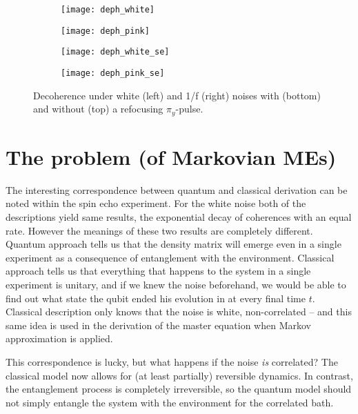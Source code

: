 \documentclass[12pt, twoside]{report}
\numberwithin{equation}{section}
\begin{document}
\begin{figure}
\begingroup
\captionsetup[subfigure]{width=0.9\textwidth}
\centering
\begin{subfigure}[t]{0.45\textwidth}
\centering
\texttt{[image: deph\_white]}
\end{subfigure}
\begin{subfigure}[t]{0.45\textwidth}
\centering
\texttt{[image: deph\_pink]}
\end{subfigure}

\begin{subfigure}[t]{0.45\textwidth}
\centering
\texttt{[image: deph\_white\_se]}
\end{subfigure}
\begin{subfigure}[t]{0.45\textwidth}
\centering
\texttt{[image: deph\_pink\_se]}
\end{subfigure}
\caption{Decoherence under white (left) and 1/f (right) noises with (bottom) and without (top) a refocusing $\pi_y$-pulse.}
\label{fig:cdeph_both}
\endgroup
\end{figure}

\section{The problem (of Markovian MEs)}

The interesting correspondence between quantum and classical derivation can be noted within the spin echo experiment. For the white noise both of the descriptions yield same results, the exponential decay of coherences with an equal rate. However the meanings of these two results are completely different. Quantum approach tells us that the density matrix will emerge even in a single experiment as a consequence of entanglement with the environment. Classical approach tells us that everything that  happens to the system in a single experiment is unitary, and if we knew the noise beforehand, we would be able to find out what state the qubit ended his evolution in at every final time $t$. Classical description only knows that the noise is white, non-correlated -- and this same idea is used in the derivation of the master equation when Markov approximation is applied.

This correspondence is lucky, but what happens if the noise \textit{is} correlated? The classical model now allows for (at least partially) reversible dynamics. In contrast, the entanglement process is completely irreversible, so the quantum model should not simply entangle the system with the environment for the correlated bath.
\end{document}
